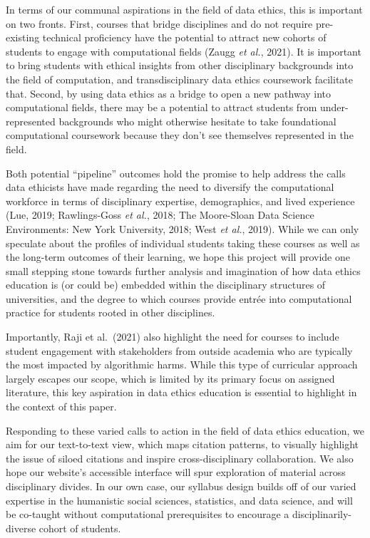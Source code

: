 \documentclass[
]{article}
\begin{document}
In terms of our communal aspirations in the field of data ethics, this
is important on two fronts. First, courses that bridge disciplines and
do not require pre-existing technical proficiency have the potential to
attract new cohorts of students to engage with computational fields
(Zaugg \emph{et al.}, 2021). It is important to bring students with
ethical insights from other disciplinary backgrounds into the field of
computation, and transdisciplinary data ethics coursework facilitate
that. Second, by using data ethics as a bridge to open a new pathway
into computational fields, there may be a potential to attract students
from under-represented backgrounds who might otherwise hesitate to take
foundational computational coursework because they don't see themselves
represented in the field.

Both potential ``pipeline'' outcomes hold the promise to help address
the calls data ethicists have made regarding the need to diversify the
computational workforce in terms of disciplinary expertise,
demographics, and lived experience (Lue, 2019; Rawlings-Goss \emph{et
al.}, 2018; The Moore-Sloan Data Science Environments: New York
University, 2018; West \emph{et al.}, 2019). While we can only speculate
about the profiles of individual students taking these courses as well
as the long-term outcomes of their learning, we hope this project will
provide one small stepping stone towards further analysis and
imagination of how data ethics education is (or could be) embedded
within the disciplinary structures of universities, and the degree to
which courses provide entrée into computational practice for students
rooted in other disciplines.

Importantly, Raji et al.~(2021) also highlight the need for courses to
include student engagement with stakeholders from outside academia who
are typically the most impacted by algorithmic harms. While this type of
curricular approach largely escapes our scope, which is limited by its
primary focus on assigned literature, this key aspiration in data ethics
education is essential to highlight in the context of this paper.

Responding to these varied calls to action in the field of data ethics
education, we aim for our text-to-text view, which maps citation
patterns, to visually highlight the issue of siloed citations and
inspire cross-disciplinary collaboration. We also hope our website's
accessible interface will spur exploration of material across
disciplinary divides. In our own case, our syllabus design builds off of
our varied expertise in the humanistic social sciences, statistics, and
data science, and will be co-taught without computational prerequisites
to encourage a disciplinarily-diverse cohort of students.
\end{document}
